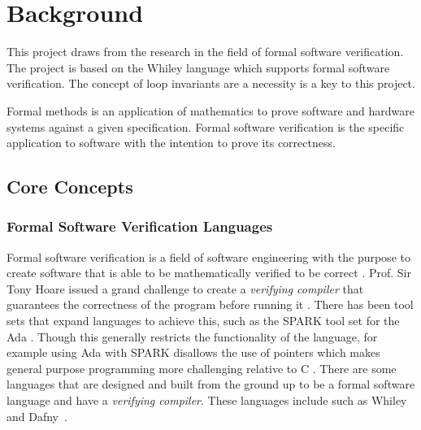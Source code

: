 \chapter{Background}\label{C:background}


This project draws from the research in the field of formal software verification.
The project is based on the Whiley language which supports formal software
verification.
The concept of loop invariants are a necessity is a key to this project.

Formal methods is an application of mathematics to prove software and hardware
systems against a given specification. 
Formal software verification is the specific application to software with
the intention to prove its correctness.


\section{Core Concepts}

\subsection{Formal Software Verification Languages}

Formal software verification is a field of software engineering with the
purpose to create software that is able to be mathematically verified to be
correct \cite{survey-formal-soft}.
Prof. Sir Tony Hoare issued a grand challenge to create a \textit{verifying compiler}
that guarantees the correctness of the program before running it \cite{Hoare-grand}.
There has been tool sets that expand languages to achieve this, such as
the SPARK tool set for the Ada \cite{spark-ada}\cite{spark-high-integ}.
Though this generally restricts the functionality of the language, for example
using Ada with SPARK disallows the use of pointers which makes general purpose
programming more challenging relative to C \cite{spark-ada}.
There are some languages that are designed and built from the ground up to
be a formal software language and have a \textit{verifying compiler}.
These languages include such as Whiley~\cite{whiley-origin} and Dafny~\cite{dafny-lang}.

